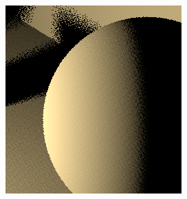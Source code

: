 \begin{figure}[h!]
{\begin{minipage}{\dimexpr .33\textwidth-\fboxsep-2\fboxrule}
\begin{subfigure}{\textwidth}
            \includegraphics[width=\textwidth]{imagenes/rect101}
            \vspace{0.2cm}


\end{subfigure}
\end{minipage}}
\end{figure}
